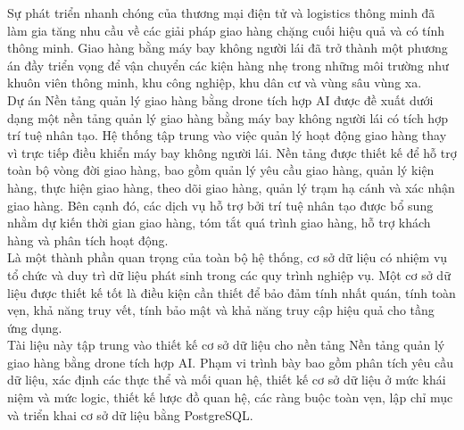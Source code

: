 
Sự phát triển nhanh chóng của thương mại điện tử và logistics thông minh đã làm gia tăng nhu cầu về các giải pháp giao hàng chặng cuối hiệu quả và có tính thông minh. Giao hàng bằng máy bay không người lái đã trở thành một phương án đầy triển vọng để vận chuyển các kiện hàng nhẹ trong những môi trường như khuôn viên thông minh, khu công nghiệp, khu dân cư và vùng sâu vùng xa.\\
Dự án Nền tảng quản lý giao hàng bằng drone tích hợp AI được đề xuất dưới dạng một nền tảng quản lý giao hàng bằng máy bay không người lái có tích hợp trí tuệ nhân tạo. Hệ thống tập trung vào việc quản lý hoạt động giao hàng thay vì trực tiếp điều khiển máy bay không người lái. Nền tảng được thiết kế để hỗ trợ toàn bộ vòng đời giao hàng, bao gồm quản lý yêu cầu giao hàng, quản lý kiện hàng, thực hiện giao hàng, theo dõi giao hàng, quản lý trạm hạ cánh và xác nhận giao hàng. Bên cạnh đó, các dịch vụ hỗ trợ bởi trí tuệ nhân tạo được bổ sung nhằm dự kiến thời gian giao hàng, tóm tắt quá trình giao hàng, hỗ trợ khách hàng và phân tích hoạt động.\\
Là một thành phần quan trọng của toàn bộ hệ thống, cơ sở dữ liệu có nhiệm vụ tổ chức và duy trì dữ liệu phát sinh trong các quy trình nghiệp vụ. Một cơ sở dữ liệu được thiết kế tốt là điều kiện cần thiết để bảo đảm tính nhất quán, tính toàn vẹn, khả năng truy vết, tính bảo mật và khả năng truy cập hiệu quả cho tầng ứng dụng.\\
Tài liệu này tập trung vào thiết kế cơ sở dữ liệu cho nền tảng Nền tảng quản lý giao hàng bằng drone tích hợp AI. Phạm vi trình bày bao gồm phân tích yêu cầu dữ liệu, xác định các thực thể và mối quan hệ, thiết kế cơ sở dữ liệu ở mức khái niệm và mức logic, thiết kế lược đồ quan hệ, các ràng buộc toàn vẹn, lập chỉ mục và triển khai cơ sở dữ liệu bằng PostgreSQL.\\
